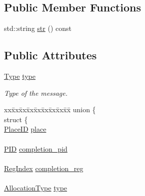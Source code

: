 \subsection*{Public Member Functions}
\begin{DoxyCompactItemize}
\item 
std\+::string \hyperlink{struct_simulator_1_1drisc_1_1_remote_message_a2c8e9626c5c9e1b8bce5de6d897dd49f}{str} () const 
\end{DoxyCompactItemize}
\subsection*{Public Attributes}
\begin{DoxyCompactItemize}
\item 
\hyperlink{struct_simulator_1_1drisc_1_1_remote_message_aa6920cd59d9069d038eeb3ddfa9fd7cd}{Type} \hyperlink{struct_simulator_1_1drisc_1_1_remote_message_ae0467d25479dbd711495bb3ca0f6ff8a}{type}
\begin{DoxyCompactList}\small\item\em Type of the message. \end{DoxyCompactList}\item 
\begin{tabbing}
xx\=xx\=xx\=xx\=xx\=xx\=xx\=xx\=xx\=\kill
union \{\\
\>struct \{\\
\>\>\hyperlink{struct_simulator_1_1_place_i_d}{PlaceID} \hyperlink{struct_simulator_1_1drisc_1_1_remote_message_a20a7c7b765b7ef4cea77a5c9c0053c80}{place}\\
\>\>\\
\>\>\hyperlink{namespace_simulator_aa671021151c047ae2da6dce4e6303476}{PID} \hyperlink{struct_simulator_1_1drisc_1_1_remote_message_a3dc58c833ef1f767e8f791cacf79a46e}{completion\_pid}\\
\>\>\\
\>\>\hyperlink{namespace_simulator_ab00c9033de4c9a17db7b53d6c292515c}{RegIndex} \hyperlink{struct_simulator_1_1drisc_1_1_remote_message_a0158ce09683551c7056bb825c6ed8fdd}{completion\_reg}\\
\>\>\\
\>\>\hyperlink{namespace_simulator_a5c7d556007e11ed2e93f9fe53c60128b}{AllocationType} \hyperlink{struct_simulator_1_1drisc_1_1_remote_message_a8faf3a1acf68adcc2270ae60f2951d64}{type}\\

\end{tabbing}
\end{DoxyCompactItemize}
